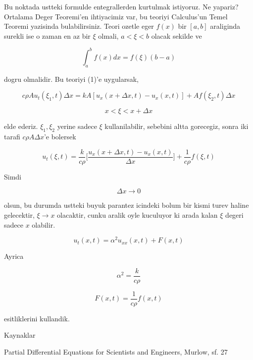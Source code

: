 \documentclass[12pt,fleqn]{article}
\begin{document}
Bu noktada ustteki formulde entegrallerden kurtulmak istiyoruz. Ne yapariz?
Ortalama Deger Teoremi'en ihtiyacimiz var, bu teoriyi Calculus'un Temel
Teoremi yazisinda bulabilirsiniz. Teori ozetle eger $f(x)$ bir $[a,b]$
araliginda surekli ise o zaman en az bir $\xi$ olmali, $a < \xi < b$ olacak
sekilde ve

\[ \int _{ a}^{b} f(x) dx = f(\xi)(b-a)  \]

dogru olmalidir. Bu teoriyi (1)'e uygularsak,

\[ c\rho A u_t(\xi_1,t)\Delta x = 
kA[u_x(x+\Delta x, t) - u_x(x,t)] + 
Af(\xi_2,t)\Delta x
 \]

\[ x < \xi < x+\Delta x \]

elde ederiz. $\xi_1,\xi_2$ yerine sadece $\xi$ kullanilabilir, sebebini
altta gorecegiz, sonra iki tarafi $c\rho A \Delta x$'e bolersek


\[ u_t(\xi,t) = 
\frac{k}{c\rho} \bigg[
\frac{u_x(x+\Delta x,t) - u_x(x,t)}
{\Delta x}
\bigg]
+ \frac{ 1}{c\rho}f(\xi,t)
 \]

Simdi 

\[ \Delta x \to 0 \]

olsun, bu durumda ustteki buyuk parantez icindeki bolum bir kismi turev
haline gelecektir, $\xi \to x$ olacaktir, cunku aralik oyle kuculuyor ki
arada kalan $\xi$ degeri sadece $x$ olabilir.

\[ u_t(x,t) = \alpha^2u_{xx}(x,t) + F(x,t) \]

Ayrica

\[ \alpha^2 = \frac{k}{c\rho} \]

\[ F(x,t) = \frac{1}{c\rho}f(x,t) \]

esitliklerini kullandik. 

Kaynaklar

Partial Differential Equations for Scientists and Engineers, Murlow, sf. 27
\end{document}

